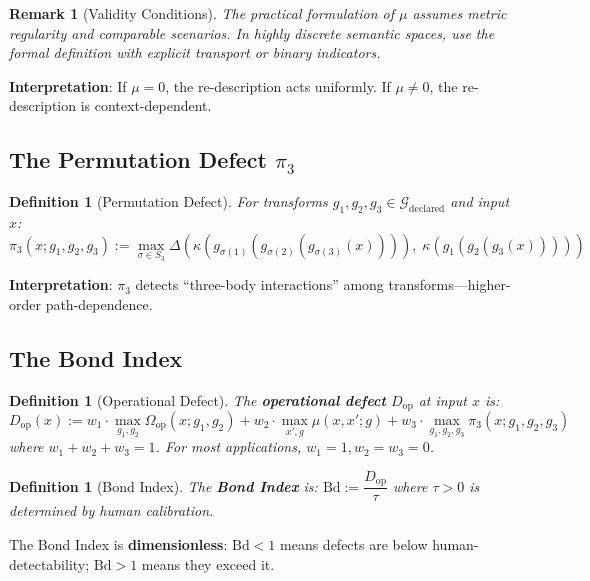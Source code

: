 \documentclass[12pt]{article}
\newtheorem{definition}[theorem]{Definition}
\newtheorem{remark}[theorem]{Remark}
\begin{document}
\begin{remark}[Validity Conditions]
\emph{The practical formulation of $\mu$ assumes metric regularity and comparable scenarios. In highly discrete semantic spaces, use the formal definition with explicit transport or binary indicators.}
\end{remark}

\textbf{Interpretation}: If $\mu = 0$, the re-description acts uniformly. If $\mu \neq 0$, the re-description is context-dependent.

\subsection{The Permutation Defect $\pi_3$}

\begin{definition}[Permutation Defect]
\emph{For transforms $g_1, g_2, g_3 \in \mathcal{G}_{\mathrm{declared}}$ and input $x$:}
\[
\pi_3(x; g_1, g_2, g_3) := \max_{\sigma \in S_3} \Delta\!\left(\kappa(g_{\sigma(1)}(g_{\sigma(2)}(g_{\sigma(3)}(x)))),\; \kappa(g_1(g_2(g_3(x))))\right)
\]
\end{definition}

\textbf{Interpretation}: $\pi_3$ detects ``three-body interactions'' among transforms---higher-order path-dependence.

\subsection{The Bond Index}

\begin{definition}[Operational Defect]
\emph{The \textbf{operational defect} $D_{\mathrm{op}}$ at input $x$ is:}
\[
D_{\mathrm{op}}(x) := w_1 \cdot \max_{g_1, g_2} \Omega_{\mathrm{op}}(x; g_1, g_2) + w_2 \cdot \max_{x', g} \mu(x, x'; g) + w_3 \cdot \max_{g_1, g_2, g_3} \pi_3(x; g_1, g_2, g_3)
\]
\emph{where $w_1 + w_2 + w_3 = 1$. For most applications, $w_1 = 1, w_2 = w_3 = 0$.}
\end{definition}

\begin{definition}[Bond Index]
\emph{The \textbf{Bond Index} is:} $\mathrm{Bd} := \dfrac{D_{\mathrm{op}}}{\tau}$ \emph{where $\tau > 0$ is determined by human calibration.}
\end{definition}

The Bond Index is \textbf{dimensionless}: $\mathrm{Bd} < 1$ means defects are below human-detectability; $\mathrm{Bd} > 1$ means they exceed it.
\end{document}
